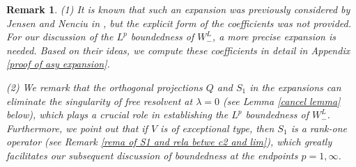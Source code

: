 \documentclass[reqno]{amsart}
\newtheorem{remark}[definition]{Remark}
\numberwithin{equation}{section}
\begin{document}
\begin{remark}
{\rm
(1) It is known that such an expansion was previously considered by Jensen and Nenciu in \cite{JN01}, but the explicit form of the coefficients was not provided. For our discussion of the $L^p$ boundedness of $W^L_{-}$, a more precise expansion is needed. Based on their ideas, we compute these coefficients in detail in Appendix \ref{proof of asy expansion}.

(2) We remark that the orthogonal projections $Q$ and $S_1$ in the expansions can eliminate the singularity of free resolvent at $\lambda=0$ (see Lemma \ref{cancel lemma} below), which plays a crucial role in establishing the $L^p$ boundedness of $W^L_{-}$.
Furthermore, we point out that if $V$ is of exceptional type, then $S_1$ is a rank-one operator (see Remark \ref{rema of S1 and rela betwe c2 and lim}), which greatly facilitates our subsequent discussion of boundedness at the endpoints $p=1,\infty$. 
}
\end{remark}
\end{document}
